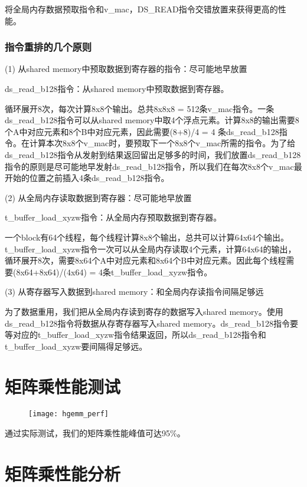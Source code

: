 将全局内存数据预取指令和v\_mac，DS\_READ指令交错放置来获得更高的性能。

\subsubsection{指令重排的几个原则}
(1) 从shared memory中预取数据到寄存器的指令：尽可能地早放置

ds\_read\_b128指令：从shared memory中预取数据到寄存器。

循环展开8次，每次计算8x8个输出。总共8x8x8 = 512条v\_mac指令。一条ds\_read\_b128指令可以从shared memory中取4个浮点元素。计算8x8的输出需要8个A中对应元素和8个B中对应元素，因此需要(8+8)/4 = 4 条ds\_read\_b128指令。在计算本次8x8个v\_mac时，要预取下一个8x8个v\_mac所需的指令。为了给ds\_read\_b128指令从发射到结果返回留出足够多的时间，我们放置ds\_read\_b128指令的原则是尽可能地早发射ds\_read\_b128指令，所以我们在每次8x8个v\_mac最开始的位置之前插入4条ds\_read\_b128指令。

(2) 从全局内存读取数据到寄存器：尽可能地早放置

t\_buffer\_load\_xyzw指令：从全局内存预取数据到寄存器。

一个block有64个线程，每个线程计算8x8个输出，总共可以计算64x64个输出。t\_buffer\_load\_xyzw指令一次可以从全局内存读取4个元素，计算64x64的输出，循环展开8次，需要8x64个A中对应元素和8x64个B中对应元素。因此每个线程需要(8x64+8x64)/(4x64) = 4条t\_buffer\_load\_xyzw指令。

(3) 从寄存器写入数据到shared memory：和全局内存读指令间隔足够远

为了数据重用，我们把从全局内存读到寄存的数据写入shared memory。使用ds\_read\_b128指令将数据从存寄存器写入shared memory。ds\_read\_b128指令要等对应的t\_buffer\_load\_xyzw指令结果返回，所以ds\_read\_b128指令和t\_buffer\_load\_xyzw要间隔得足够远。

\section{矩阵乘性能测试}
\begin{figure}[htbp]
	\centering
	\texttt{[image: hgemm\_perf]}
	\label{fig:hgemm_perf}
\end{figure}

通过实际测试，我们的矩阵乘性能峰值可达95\%。

\section{矩阵乘性能分析}
